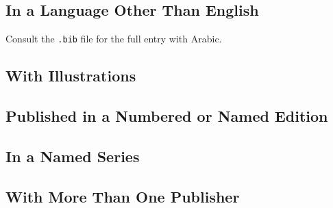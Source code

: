 \documentclass{article}
\begin{document}
\subsection{In a Language Other Than English} %
\label{ssub:in_a_language_other_than_english}
\begin{refsection}
Consult the {\tt .bib} file for the full entry with Arabic.
	\printbibliography[heading=none]
\end{refsection}
\subsection{With Illustrations} %
\label{ssub:with_illustrations}
\begin{refsection}
	\printbibliography[heading=none]
\end{refsection}
\subsection{Published in a Numbered or Named Edition} %
\label{ssub:published_in_a_numbered_or_named_edition}
\begin{refsection}
	\printbibliography[heading=none]
\end{refsection}
\subsection{In a Named Series} %
\label{ssub:in_a_named_series}
\begin{refsection}
	\printbibliography[heading=none]
\end{refsection}
\subsection{With More Than One Publisher} %
\label{ssub:with_more_than_one_publisher}
\begin{refsection}
	\printbibliography[heading=none]
\end{refsection}
\end{document}
